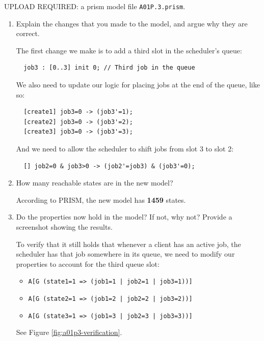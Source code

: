 \documentclass[12pt,a4paper]{article}
\begin{document}
\begin{description}
\color{red} \par UPLOAD REQUIRED: a prism model file \texttt{A01P.3.prism}.\color{black}

\begin{enumerate}[label=\alph*)]
\item Explain the changes that you made to the model, and argue why they are correct.
%
\ifwithanswers
\color{blue}
\par
The first change we make is to add a third slot in the scheduler's queue:
\begin{lstlisting}
  job3 : [0..3] init 0; // Third job in the queue
\end{lstlisting}
We also need to update our logic for placing jobs at the end of the queue, like so:
\begin{lstlisting}
  [create1] job3=0 -> (job3'=1);
  [create2] job3=0 -> (job3'=2);
  [create3] job3=0 -> (job3'=3);
\end{lstlisting}
And we need to allow the scheduler to shift jobs from slot 3 to slot 2:
\begin{lstlisting}
  [] job2=0 & job3>0 -> (job2'=job3) & (job3'=0);
\end{lstlisting}
\color{black}
\fi
%
\item How many reachable states are in the new model?
%
\ifwithanswers
\color{blue}
\par
According to PRISM, the new model has \textbf{1459} states.
\color{black}
\fi
%
\item Do the properties now hold in the model? If not, why not? Provide a screenshot showing the results.
%
\ifwithanswers
\color{blue}
\par
To verify that it still holds that whenever a client has an active job, the scheduler has that job somewhere in its queue, we need to modify our properties to account for the third queue slot:
\begin{itemize}
    \item \texttt{A[G (state1=1 => (job1=1 | job2=1 | job3=1))]}
    \item \texttt{A[G (state2=1 => (job1=2 | job2=2 | job3=2))]}
    \item \texttt{A[G (state3=1 => (job1=3 | job2=3 | job3=3))]}
\end{itemize}
See Figure \ref{fig:a01p3-verification}.
\begin{figure}[H]
    \centering


\end{figure}
\end{enumerate}
\end{description}
\end{document}
